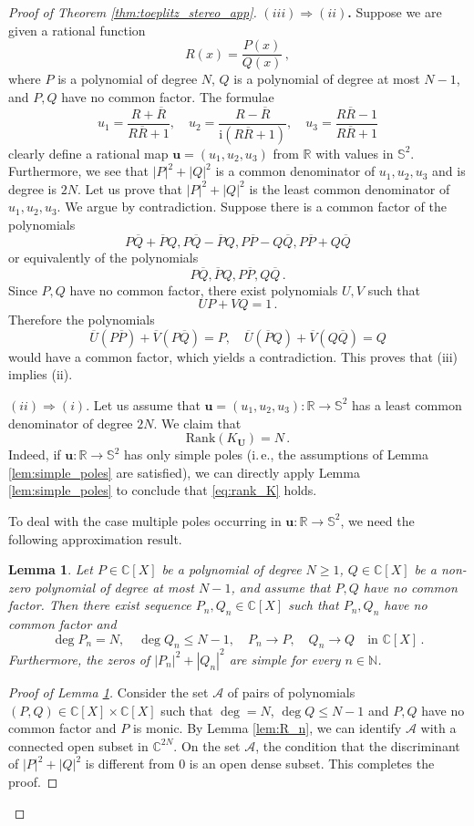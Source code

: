 \documentclass[11pt,reqno]{amsart}
\newtheorem{lem}{Lemma}[section]
\theoremstyle{definition}
\theoremstyle{remark}
\theoremstyle{remark}
\numberwithin{equation}{section}
\newcommand{\C}{\mathbb{C}}
\newcommand{\N}{\mathbb{N}}
\newcommand{\R}{\mathbb{R}}
\newcommand{\Ss}{\mathbb{S}}
\newcommand{\ov}{\overline}
\newcommand{\be}{\begin{equation}}
\newcommand{\ee}{\end{equation}}
\newcommand{\ii}{\mathrm{i}}
\newcommand{\uu}{\mathbf{u}}
\newcommand{\Ub}{\mathbf{U}}
\begin{document}
\begin{appendix}
\begin{proof}[Proof of Theorem \ref{thm:toeplitz_stereo_app}]
\medskip
\textbf{$(iii) \Rightarrow (ii)$.} Suppose we are given a rational function
$$
R(x) = \frac{P(x)}{Q(x)} \, ,
$$
where $P$ is a polynomial of degree $N$, $Q$ is a polynomial of degree at most $N-1$, and $P, Q$ have no common factor. The formulae
$$
u_1 = \frac{R + \ov{R}}{R \ov{R}+1}, \quad u_2 = \frac{R - \ov{R}}{\ii (R \ov{R}+1)}, \quad u_3 = \frac{R \ov{R}-1}{R \ov{R}+1} 
$$
clearly define a rational map $\uu=(u_1,u_2, u_3)$ from $\R$ with values in $\Ss^2$. Furthermore, we see that $|P|^2 + |Q|^2$ is a common denominator of $u_1,u_2,u_3$ and is degree is $2N$. Let us prove that $|P|^2 + |Q|^2$ is the least common denominator of $u_1, u_2, u_3$. We argue by contradiction. Suppose there is a common factor of the polynomials
$$
P \ov{Q} + \ov{P} Q, P \ov{Q}- \ov{P} Q, P \ov{P} - Q \ov{Q}, P \ov{P}  + Q \ov{Q}
$$
or equivalently of the polynomials
$$
P \ov{Q}, \ov{P} Q, P \ov{P}, Q \ov {Q} \, .
$$
Since $P, Q$ have no common factor, there exist polynomials $U, V$ such that
$$
UP + VQ = 1 \, .
$$
Therefore the polynomials
$$
\ov{U} (P \ov{P} )+ \ov{V}(P \ov{Q}) = P, \quad \ov{U} (\ov{P} Q) + \ov{V} ( Q \ov{Q} ) = Q
$$
would have a common factor, which yields a contradiction. This proves that (iii) implies (ii).

\medskip
\textbf{$(ii) \Rightarrow (i).$} Let us assume that $\uu = (u_1, u_2, u_3) : \R \to \Ss^2$ has a least common denominator of degree $2N$. We claim that
\be \label{eq:rank_K}
\mathrm{Rank} (K_\Ub) = N \, .
\ee
Indeed, if $\uu : \R \to \Ss^2$ has only simple poles (i.\,e., the assumptions of Lemma \ref{lem:simple_poles} are satisfied), we can directly apply Lemma \ref{lem:simple_poles} to conclude that \eqref{eq:rank_K} holds.

To deal with the case multiple poles occurring in $\uu : \R \to \Ss^2$, we need the following approximation result.

\begin{lem} \label{lem:rat_approx}
Let $P \in \C[X]$ be a polynomial of degree $N \geq 1$, $Q \in  \C[X]$ be a non-zero polynomial of degree at most $N-1$, and assume that $P,Q$ have no common factor. Then there exist sequence $P_n, Q_n \in \C[X]$ such that $P_n, Q_n$ have no common factor and
$$
\deg P_n = N, \quad \deg Q_n \leq N-1, \quad P_n \to P, \quad Q_n \to Q \quad \mbox{in $\C[X]$} \, .
$$
Furthermore, the zeros of $|P_n|^2 + |Q_n|^2$ are simple for every $n \in \N$.
\end{lem}

\begin{proof}[Proof of Lemma \ref{lem:rat_approx}]
Consider the set $\mathcal{A}$ of pairs of polynomials $(P,Q) \in \C[X] \times \C[X]$ such that $\deg = N$, $\deg Q \leq N-1$ and $P,Q$ have no common factor and $P$ is monic. By Lemma \ref{lem:R_n}, we can identify $\mathcal{A}$ with a connected open subset in $\C^{2N}$. On the set $\mathcal{A}$, the condition that the discriminant of $|P|^2 + |Q|^2$ is different from 0 is an open dense subset. This completes the proof. 
\end{proof}


\end{proof}
\end{appendix}
\end{document}
